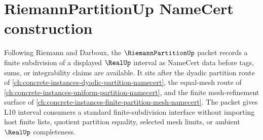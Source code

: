 \chapter{RiemannPartitionUp NameCert construction}
\label{ch:concrete-instances-riemann-partition-namecert}

Following Riemann and Darboux, the $\RiemannPartitionUp$ packet records a finite subdivision of a displayed $\RealUp$ interval as NameCert data before tags, sums, or integrability claims are available. It sits after the dyadic partition route of \autoref{ch:concrete-instances-dyadic-partition-namecert}, the equal-mesh route of \autoref{ch:concrete-instances-uniform-partition-namecert}, and the finite mesh-refinement surface of \autoref{ch:concrete-instances-finite-partition-mesh-namecert}. The packet gives L10 interval consumers a standard finite-subdivision interface without importing host finite lists, quotient partition equality, selected mesh limits, or ambient $\RealUp$ completeness.

